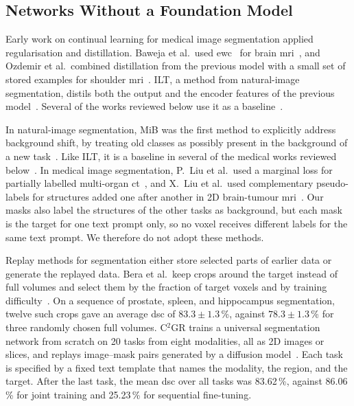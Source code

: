 \subsection{Networks Without a Foundation Model}
\label{subsec:cl-medseg-net}

Early work on continual learning for medical image segmentation applied regularisation and distillation.
Baweja et al.\ used \gls{ewc}~\cite{Kirkpatrick_2017} for brain \gls{mri}~\cite{baweja2018continuallearningmedicalimaging}, and Ozdemir et al.\ combined distillation from the previous model with a small set of stored examples for shoulder \gls{mri}~\cite{Ozdemir_2018}.
ILT, a method from natural-image segmentation, distils both the output and the encoder features of the previous model~\cite{michieli2019incrementallearningtechniquessemantic}.
Several of the works reviewed below use it as a baseline~\cite{ji2023continualsegmentsingleunified,liu2024universalextensible}.

In natural-image segmentation, MiB was the first method to explicitly address background shift, by treating old classes as possibly present in the background of a new task~\cite{cermelli2020modelingbackgroundincrementallearning}.
Like ILT, it is a baseline in several of the medical works reviewed below~\cite{ji2023continualsegmentsingleunified,gonzalez2023lifelong}.
In medical image segmentation, P.~Liu et al.\ used a marginal loss for partially labelled multi-organ \gls{ct}~\cite{liu2022learningincrementallysegmentmultiple}, and X.~Liu et al.\ used complementary pseudo-labels for structures added one after another in 2D brain-tumour \gls{mri}~\cite{liu2023incrementallearningheterogeneousstructure}.
Our masks also label the structures of the other tasks as background, but each mask is the target for one text prompt only, so no voxel receives different labels for the same text prompt.
We therefore do not adopt these methods.

Replay methods for segmentation either store selected parts of earlier data or generate the replayed data.
Bera et al.\ keep crops around the target instead of full volumes and select them by the fraction of target voxels and by training difficulty~\cite{memory_replay_cropping}.
On a sequence of prostate, spleen, and hippocampus segmentation, twelve such crops gave an average \gls{dsc} of $83.3 \pm 1.3$\,\%, against $78.3 \pm 1.3$\,\% for three randomly chosen full volumes.
C$^2$GR trains a universal segmentation network from scratch on 20 tasks from eight modalities, all as 2D images or slices, and replays image--mask pairs generated by a diffusion model~\cite{li2026c2gr}.
Each task is specified by a fixed text template that names the modality, the region, and the target.
After the last task, the mean \gls{dsc} over all tasks was 83.62\,\%, against 86.06\,\% for joint training and 25.23\,\% for sequential fine-tuning.

